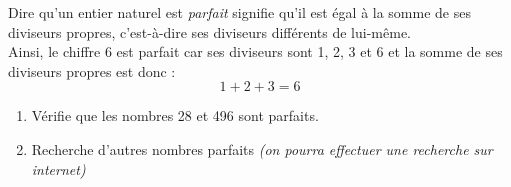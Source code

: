 
Dire qu'un entier naturel est {\em parfait} signifie qu'il est égal à la somme de ses diviseurs propres, c'est-à-dire ses diviseurs différents de lui-même.\\Ainsi, le chiffre 6 est parfait car ses diviseurs sont 1, 2, 3 et 6 et la somme de ses diviseurs propres est donc :
\[1+2+3=6\]
\begin{enumerate}
\item Vérifie que les nombres 28 et 496 sont parfaits.
\item Recherche d'autres nombres parfaits \textit{(on pourra effectuer une recherche sur internet)}
\end{enumerate}

